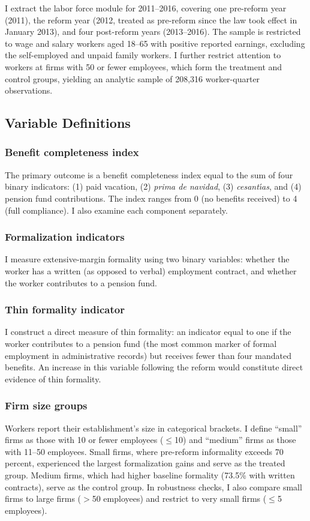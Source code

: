 \documentclass[12pt]{article}
\begin{document}
I extract the labor force module for 2011--2016, covering one pre-reform year (2011), the reform year (2012, treated as pre-reform since the law took effect in January 2013), and four post-reform years (2013--2016). The sample is restricted to wage and salary workers aged 18--65 with positive reported earnings, excluding the self-employed and unpaid family workers. I further restrict attention to workers at firms with 50 or fewer employees, which form the treatment and control groups, yielding an analytic sample of 208,316 worker-quarter observations.

\subsection{Variable Definitions}

\subsubsection*{Benefit completeness index} The primary outcome is a benefit completeness index equal to the sum of four binary indicators: (1) paid vacation, (2) \textit{prima de navidad}, (3) \textit{cesant\'{\i}as}, and (4) pension fund contributions. The index ranges from 0 (no benefits received) to 4 (full compliance). I also examine each component separately.

\subsubsection*{Formalization indicators} I measure extensive-margin formality using two binary variables: whether the worker has a written (as opposed to verbal) employment contract, and whether the worker contributes to a pension fund.

\subsubsection*{Thin formality indicator} I construct a direct measure of thin formality: an indicator equal to one if the worker contributes to a pension fund (the most common marker of formal employment in administrative records) but receives fewer than four mandated benefits. An increase in this variable following the reform would constitute direct evidence of thin formality.

\subsubsection*{Firm size groups} Workers report their establishment's size in categorical brackets. I define ``small'' firms as those with 10 or fewer employees ($\leq$10) and ``medium'' firms as those with 11--50 employees. Small firms, where pre-reform informality exceeds 70 percent, experienced the largest formalization gains and serve as the treated group. Medium firms, which had higher baseline formality (73.5\% with written contracts), serve as the control group. In robustness checks, I also compare small firms to large firms ($>$50 employees) and restrict to very small firms ($\leq$5 employees).
\end{document}
